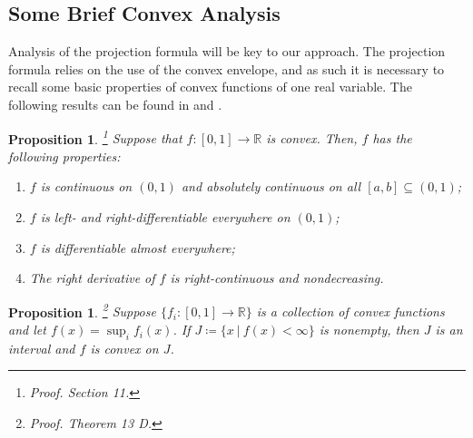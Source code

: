 \documentclass[11pt]{article}
\newtheorem{prop}[thm]{Proposition}
\newtheorem{defn}[thm]{Definition}
\numberwithin{equation}{section}
\begin{document}
\subsection{Some Brief Convex Analysis}

    Analysis of the projection formula will be key to our approach. The projection formula relies on the use of the convex envelope, and as such it is necessary to recall some basic properties of convex functions of one real variable. The following results can be found in \cite{Roberts} and \cite{Rockafellar}.  
    \begin{prop}\label{convex-properties} \!\!\!\! \footnote{\textit{Proof.} \cite{Roberts} Section 11.}
        Suppose that $f:[0,1]\to\mathbb{R}$ is convex. Then, $f$ has the following properties:
        \begin{enumerate}[label=\textup{(\roman*)}]
            \item $f$ is continuous on $(0,1)$ and absolutely continuous on all $[a,b]\subseteq(0,1)$;
            \item $f$ is left- and right-differentiable everywhere on $(0,1)$;
            \item $f$ is differentiable almost everywhere;
            \item The right derivative of $f$ is right-continuous and nondecreasing. 
        \end{enumerate}
    \end{prop}
    \begin{prop}\label{pointwise-sup} \!\!\!\! \footnote{\textit{Proof.} \cite{Roberts} Theorem 13 D.}
        Suppose $\{f_i:[0, 1]\to\mathbb{R}\}$ is a collection of convex functions and let $f(x)=\sup_i f_i(x)$. %
        If $J\coloneq\{x \ | \ f(x)<\infty\}$ is nonempty, then $J$ is an interval and $f$ is convex on $J$. 
    \end{prop}
\end{document}
